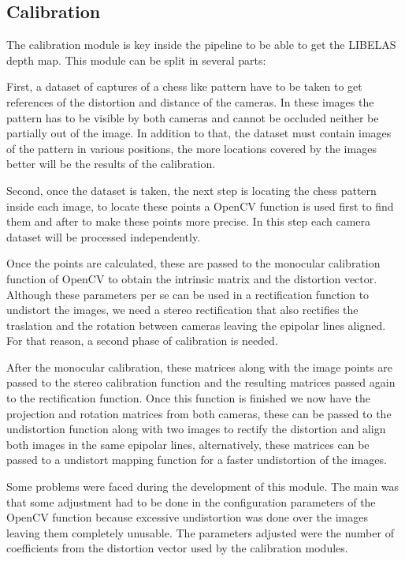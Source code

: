 \documentclass[10pt,a4paper,twocolumn,twoside]{article}
\begin{document}
	\subsection{Calibration}
	
	The calibration module is key inside the pipeline to be able to get the LIBELAS depth map. This module can be split in several parts:  
	
	First, a dataset of captures of a chess like pattern have to be taken to get references of the distortion and distance of the cameras. In these images the pattern has to be visible by both cameras and cannot be occluded neither be partially out of the image. In addition to that, the dataset must contain images of the pattern in various positions, the more locations covered by the images better will be the results of the calibration. 
	
	Second, once the dataset is taken, the next step is locating the chess pattern inside each image, to locate these points a OpenCV function is used first to find them and after to make these points more precise. In this step each camera dataset will be processed independently. 
	
	Once the points are calculated, these are passed to the monocular calibration function of OpenCV to obtain the intrinsic matrix and the distortion vector.  Although these parameters per se can be used in a rectification function to undistort the images, we need a stereo rectification that also rectifies the traslation and the rotation between cameras leaving the epipolar lines aligned. For that reason, a second phase of calibration is needed. 
	
	After the monocular calibration, these matrices along with the image points are passed to the stereo calibration function and the resulting matrices passed again to the rectification function. Once this function is finished we now have the projection and rotation matrices from both cameras, these can be passed to the undistortion function along with two images to rectify the distortion and align both images in the same epipolar lines, alternatively, these matrices can be passed to a undistort mapping function for a faster undistortion of the images.  
	
	
	
	Some problems were faced during the development of this module. The main was that some adjustment had to be done in the configuration parameters of the OpenCV function because excessive undistortion was done over the images leaving them completely unusable. The parameters adjusted were the number of coefficients from the distortion vector used by the calibration modules. 
	
\end{document}
